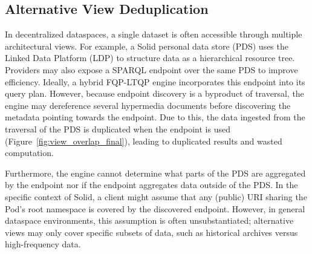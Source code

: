 \documentclass{ceurart}
\theoremstyle{definition}
\begin{document}
\subsection{Alternative View Deduplication}
In decentralized dataspaces, a single dataset is often accessible through multiple architectural views.
For example, a Solid personal data store (PDS) uses the Linked Data Platform (LDP) to structure data as a hierarchical resource tree.
Providers may also expose a SPARQL endpoint over the same PDS to improve efficiency.
Ideally, a hybrid FQP-LTQP engine incorporates this endpoint into its query plan.
However, because endpoint discovery is a byproduct of traversal,
the engine may dereference several hypermedia documents before discovering the metadata pointing towards the endpoint.
Due to this, the data ingested from the traversal of the PDS is duplicated when the endpoint is used (Figure~\ref{fig:view_overlap_final}),
leading to duplicated results and wasted computation.

Furthermore, the engine cannot determine what parts of the PDS are aggregated by the endpoint nor if the endpoint aggregates data outside
of the PDS\@.
In the specific context of Solid, a client might assume that any (public) URI sharing the Pod's root namespace is covered by the discovered endpoint.
However, in general dataspace environments, this assumption is often unsubstantiated;
alternative views may only cover specific subsets of data, such as historical archives versus high-frequency data. 



\end{document}
